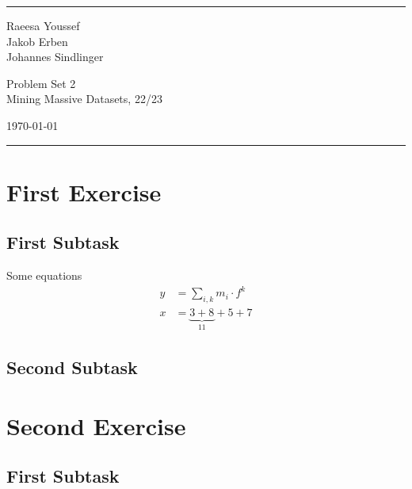 \documentclass[a4paper]{article}
\begin{document}

\fancyhead[C]{}
\hrule \medskip %
\begin{minipage}{0.295\textwidth} 
\raggedright
\footnotesize
Raeesa Youssef \hfill\\   
Jakob Erben\hfill\\
Johannes Sindlinger
\end{minipage}
\begin{minipage}{0.4\textwidth} 
\centering 
\large 
Problem Set 2\\ 
\normalsize 
Mining Massive Datasets, 22/23\\ 
\end{minipage}
\begin{minipage}{0.295\textwidth} 
\raggedleft
\today\hfill\\
\end{minipage}
\medskip\hrule 
\bigskip


\section{First Exercise}
\blindtext
\subsection{First Subtask}
Some equations
\begin{align*}
y &=  \sum\limits_{i,k} m_i \cdot f^k \\
x &=  
\underset{11}{\underbrace{3 + 8}} + 5 + 7
\end{align*}

\subsection{Second Subtask}
\blindtext

\bigskip


\section{Second Exercise}
\blindtext
\subsection{First Subtask}

\bigskip

\end{document}
